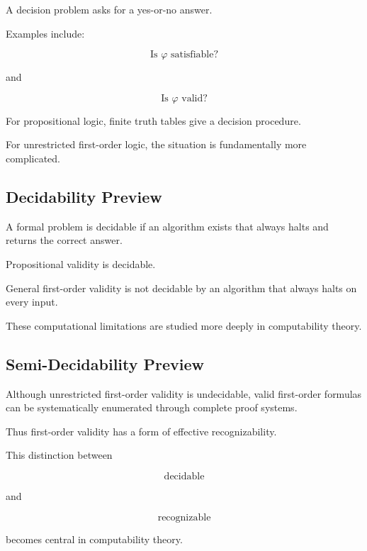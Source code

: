A decision problem asks for a yes-or-no answer.

Examples include:

\[
\boxed{
\text{Is \(\varphi\) satisfiable?}
}
\]

and

\[
\boxed{
\text{Is \(\varphi\) valid?}
}
\]

For propositional logic, finite truth tables give a decision procedure.

For unrestricted first-order logic, the situation is fundamentally more
complicated.

\subsection{Decidability Preview}
\label{subsec:formal-decidability-preview}

A formal problem is decidable if an algorithm exists that always halts and
returns the correct answer.

Propositional validity is decidable.

General first-order validity is not decidable by an algorithm that always
halts on every input.

These computational limitations are studied more deeply in computability
theory.

\subsection{Semi-Decidability Preview}
\label{subsec:formal-semidecidability-preview}

Although unrestricted first-order validity is undecidable, valid
first-order formulas can be systematically enumerated through complete
proof systems.

Thus first-order validity has a form of effective recognizability.

This distinction between

\[
\boxed{
\text{decidable}
}
\]

and

\[
\boxed{
\text{recognizable}
}
\]

becomes central in computability theory.

